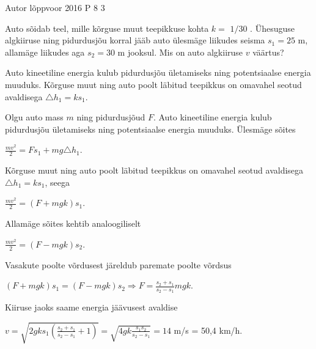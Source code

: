 {Autor} %
{lõppvoor} %
{2016} %
{P 8} %
{3} %
{

\ifStatement
Auto sõidab teel, mille kõrguse muut teepikkuse kohta $k = $ $1/30$ . Ühesuguse algkiiruse ning pidurdusjõu korral jääb auto ülesmäge liikudes seisma $s_1 = 25$ m, allamäge liikudes aga $s_2 = 30$ m jooksul. Mis on auto algkiiruse $v$ väärtus?
\fi

\ifHint
Auto kineetiline energia kulub pidurdusjõu ületamiseks ning potentsiaalse energia muuduks. Kõrguse muut ning auto poolt läbitud teepikkus on omavahel seotud avaldisega $\triangle h_1 = ks_1$.
\fi

\ifSolution
Olgu auto mass $m$ ning pidurdusjõud $F$. Auto kineetiline energia kulub pidurdusjõu ületamiseks ning potentsiaalse energia muuduks. Ülesmäge sõites
\begin{center}
$\frac{mv^2}{2} = Fs_1 + mg\triangle h_1$.
\end{center}
Kõrguse muut ning auto poolt läbitud teepikkus on omavahel seotud avaldisega $\triangle h_1 = ks_1$, seega
\begin{center}
$\frac{mv^2}{2} = (F + mgk)s_1$.
\end{center}
Allamäge sõites kehtib analoogiliselt
\begin{center}
$\frac{mv^2}{2} = (F - mgk) s_2$.
\end{center}
Vasakute poolte võrdusest järeldub paremate poolte võrdsus
\begin{center}
$(F + mgk)s_1 = (F - mgk)s_2 \Rightarrow F = \frac{s_2 + s_1}{s_2 - s_1}mgk$.
\end{center}
Kiiruse jaoks saame energia jäävusest avaldise
\begin{center}
$v = \sqrt{2gks_1 (\frac{s_2 + s_1}{s_2 - s_1} + 1)} = \sqrt{4gk\frac{s_1 s_2}{s_2 - s_1}} = 14$ m/s = 50,4 km/h.
\end{center}
\fi
}
